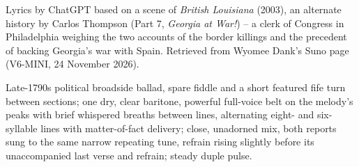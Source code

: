 
\begin{notes}
Lyrics by ChatGPT based on a scene of \emph{British Louisiana} (2003), an alternate history by Carlos Thompson (Part 7, \emph{Georgia at War!}) -- a clerk of Congress in Philadelphia weighing the two accounts of the border killings and the precedent of backing Georgia's war with Spain. Retrieved from Wyomee Dank's Suno page (V6-MINI, 24 November 2026).
\end{notes}
\begin{style}
Late-1790s political broadside ballad, spare fiddle and a short featured fife turn between sections; one dry, clear baritone, powerful full-voice belt on the melody’s peaks with brief whispered breaths between lines, alternating eight- and six-syllable lines with matter-of-fact delivery; close, unadorned mix, both reports sung to the same narrow repeating tune, refrain rising slightly before its unaccompanied last verse and refrain; steady duple pulse.
\end{style}
